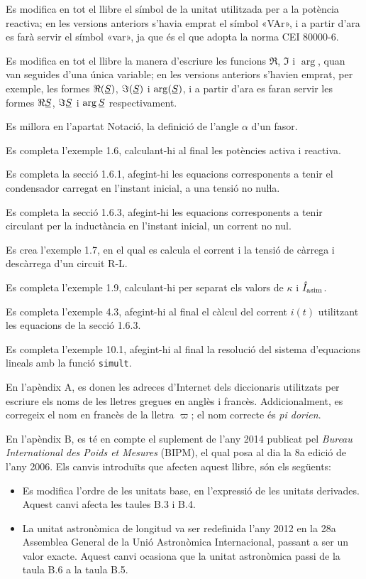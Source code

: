 Es modifica en tot el llibre el símbol de la unitat  utilitzada per a la potència reactiva; en les versions anteriors s'havia emprat el símbol «VAr», i a partir d'ara es farà servir el símbol «var», ja que és el que adopta la norma CEI 80000-6.

Es modifica en tot el llibre la manera d'escriure les funcions $\Re$, $\Im$ i $\arg$, quan van seguides d'una única variable; en les versions anteriors s'havien emprat, per exemple, les formes $\Re(\cmplx{S})$, $\Im(\cmplx{S})$ i $\arg(\cmplx{S})$, i a partir d'ara es faran servir les formes $\Re\cmplx{S}$, $\Im\cmplx{S}$ i $\arg\cmplx{S}$ respectivament.


Es millora en l’apartat Notació, la definició de l’angle $\alpha$ d’un fasor.


Es completa l'exemple 1.6, calculant-hi al final les potències activa i reactiva.

Es completa la secció 1.6.1, afegint-hi les equacions corresponents a tenir el condensador carregat en l'instant inicial, a una tensió no nuŀla.

Es completa la secció 1.6.3, afegint-hi les equacions corresponents a tenir circulant per la inductància en l'instant  inicial, un corrent no nul.

Es crea l'exemple 1.7, en el qual es calcula el corrent i la tensió de càrrega i descàrrega d'un circuit R-L.

Es completa l'exemple 1.9, calculant-hi per separat els valors de $\kappa$ i $\hat{I}_\mathrm{asim}$.


Es completa l'exemple 4.3, afegint-hi al final el càlcul del corrent $i(t)$ utilitzant les equacions de la secció 1.6.3.

Es completa l'exemple 10.1, afegint-hi al final la resolució del sistema d'equacions lineals amb la funció \texttt{simult}.


En l'apèndix A, es donen les adreces d'Internet dels diccionaris utilitzats per escriure els noms de les lletres gregues en anglès i francès. Addicionalment, es corregeix el nom en francès de la lletra $\varpi$; el nom correcte és \textit{pi dorien}.

En l'apèndix B, es té en compte el suplement de l'any 2014 publicat pel  \textit{Bureau International des Poids et Mesures} (BIPM), el qual posa al dia la 8a edició de  l'any 2006. Els canvis introduïts que afecten aquest llibre, són els següents:
\begin{itemize}
  \item Es modifica l'ordre de les unitats base, en l'expressió de les unitats derivades. Aquest canvi afecta les taules B.3 i B.4.
  \item La unitat astronòmica de longitud va ser redefinida l'any 2012 en la 28a Assemblea General de la Unió Astronòmica Internacional, passant a ser un valor exacte. Aquest canvi ocasiona que la unitat astronòmica passi de la taula B.6  a la taula  B.5.
\end{itemize}

